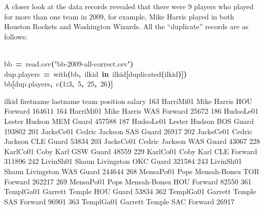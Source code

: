 \documentclass[english]{article}
\newenvironment{dummy}{\par}{\par}
\newcommand{\hlnumber}[1]{\textcolor[rgb]{0.0823529411764706,0.0784313725490196,0.709803921568627}{#1}}%
\newcommand{\hlfunctioncall}[1]{\textcolor[rgb]{1,0,0}{#1}}%
\newcommand{\hlstring}[1]{\textcolor[rgb]{0.6,0.6,1}{#1}}%
\newcommand{\hlkeyword}[1]{\textcolor[rgb]{0,0,0}{\textbf{#1}}}%
\newcommand{\hlassignement}[1]{\textcolor[rgb]{0.215686274509804,0.215686274509804,0.384313725490196}{\textbf{#1}}}%
\newcommand{\hlsymbol}[1]{\textcolor[rgb]{0,0,0}{#1}}%
\newcommand{\hlprompt}[1]{\textcolor[rgb]{0,0,0}{#1}}%
\newcommand{\hlstd}[1]{\textcolor[rgb]{0,0,0}{#1}}%
\begin{document}
A closer look at the data records revealed that there were 9 players
who played for more than one team in 2009, for example, Mike Harris
played in both Houston Rockets and Washington Wizards. All the {}``duplicate''
records are as follows:
\begin{dummy}
\hspace*{\fill}\\
\hlstd{}\ttfamily\noindent
\hlprompt{\usebox{\hlnormalsizeboxgreaterthan}{\ }}\hlsymbol{bb}{\ }\hlassignement{=}{\ }\hlfunctioncall{read.csv}\hlkeyword{(}\hlstring{"bb-2009-all-correct.csv"}\hlkeyword{)}\mbox{}
\normalfont
\hspace*{\fill}\\
\hlstd{}\ttfamily\noindent
\hlprompt{\usebox{\hlnormalsizeboxgreaterthan}{\ }}\hlsymbol{dup.players}{\ }\hlassignement{=}{\ }\hlfunctioncall{with}\hlkeyword{(}\hlsymbol{bb}\hlkeyword{,}{\ }\hlsymbol{ilkid}{\ }\hlkeyword{\usebox{\hlnormalsizeboxpercent}in\usebox{\hlnormalsizeboxpercent}}{\ }\hlsymbol{ilkid}\hlkeyword{[}\hlfunctioncall{duplicated}\hlkeyword{(}\hlsymbol{ilkid}\hlkeyword{)}\hlkeyword{]}\hlkeyword{)}\mbox{}
\normalfont
\hspace*{\fill}\\
\hlstd{}\ttfamily\noindent
\hlprompt{\usebox{\hlnormalsizeboxgreaterthan}{\ }}\hlsymbol{bb}\hlkeyword{[}\hlsymbol{dup.players}\hlkeyword{,}{\ }\hlfunctioncall{c}\hlkeyword{(}\hlnumber{1}\hlkeyword{:}\hlnumber{3}\hlkeyword{,}{\ }\hlnumber{5}\hlkeyword{,}{\ }\hlnumber{25}\hlkeyword{,}{\ }\hlnumber{26}\hlkeyword{)}\hlkeyword{]}\mbox{}
\normalfont
\hspace*{\fill}\\
\hlstd{}\begin{Schunk}
\begin{Soutput}
        ilkid firstname     lastname team position salary
163 HarriMi01      Mike       Harris  HOU  Forward 164611
164 HarriMi01      Mike       Harris  WAS  Forward  25672
186 HudsoLe01    Lester       Hudson  MEM    Guard 457588
187 HudsoLe01    Lester       Hudson  BOS    Guard 193802
201 JacksCe01    Cedric      Jackson  SAS    Guard  26917
202 JacksCe01    Cedric      Jackson  CLE    Guard  53834
203 JacksCe01    Cedric      Jackson  WAS    Guard  43067
228  KarlCo01      Coby         Karl  GSW    Guard  48559
229  KarlCo01      Coby         Karl  CLE  Forward 311896
242 LivinSh01     Shaun   Livingston  OKC    Guard 321584
243 LivinSh01     Shaun   Livingston  WAS    Guard 244644
268 MensaPo01      Pops Mensah-Bonsu  TOR  Forward 262217
269 MensaPo01      Pops Mensah-Bonsu  HOU  Forward  82550
361 TemplGa01   Garrett       Temple  HOU    Guard  53834
362 TemplGa01   Garrett       Temple  SAS  Forward  96901
363 TemplGa01   Garrett       Temple  SAC  Forward  26917
\end{Soutput}

\end{Schunk}
\end{dummy}
\end{document}
